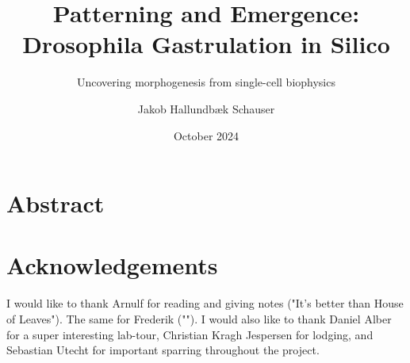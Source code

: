 \documentclass[12pt, oneside]{book}
\author{Jakob Hallundbæk Schauser}
\title{Patterning and Emergence:\\ Drosophila Gastrulation in Silico}
\subtitle{Uncovering morphogenesis from single-cell biophysics}
\date{October 2024}
\begin{document}


\maketitle
\frontmatter %
\pagestyle{plain} %


\section*{Abstract}
\label{sec:abstract}



\newpage
\section*{Acknowledgements}
\label{sec:acks}
I would like to thank Arnulf for reading and giving notes ("It's better than House of Leaves"). The same for Frederik (""). I would also like to thank Daniel Alber for a super interesting lab-tour, Christian Kragh Jespersen for lodging, and Sebastian Utecht for important sparring throughout the project.\\
\end{document}

